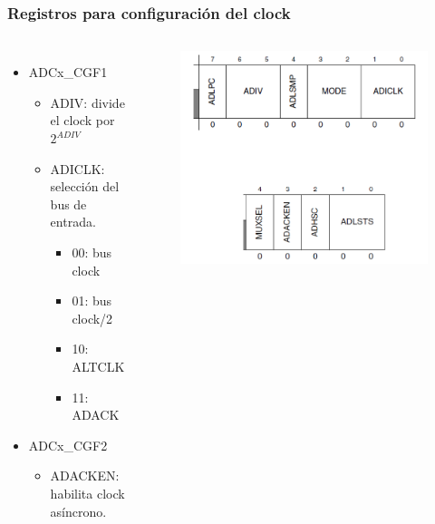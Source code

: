 \documentclass[10.5pt,scale=1.0,t,aspectratio=169,hyperref={pdfpagelabels=false}]{beamer}
\begin{document}
\begin{frame}
	\frametitle{Registros para configuración del clock}
	{\small
		\begin{columns}
			\begin{itemize}
				\item ADCx\_CGF1
				\begin{itemize}
					\item ADIV: divide el clock por $2^{ADIV}$
					\item ADICLK: selección del bus de entrada.
					\begin{itemize}
						\item 00: bus clock
						\item 01: bus clock/2
						\item 10: ALTCLK
						\item 11: ADACK
					\end{itemize}
				\end{itemize}
				\item ADCx\_CGF2 
				\begin{itemize}
					\item ADACKEN: habilita clock asíncrono. 
				\end{itemize}
			\end{itemize}
			
			\begin{figure}
				\centering
				\includegraphics[scale=0.4]{fig_ADCRegister}
			\end{figure}
		\end{columns}
	}
\end{frame}
\end{document}
